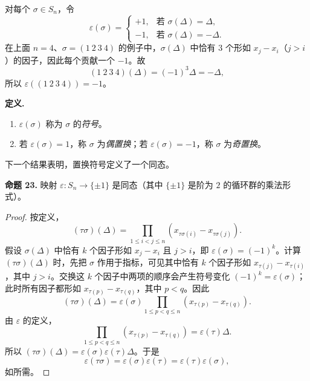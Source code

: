 对每个 $\sigma\in S_n$，令
\[
  \varepsilon(\sigma)=
  \begin{cases}
    +1,&\text{若 }\sigma(\Delta)=\Delta,\\
    -1,&\text{若 }\sigma(\Delta)=-\Delta.
  \end{cases}
\]
在上面 $n=4$、$\sigma=(1\ 2\ 3\ 4)$ 的例子中，$\sigma(\Delta)$ 中恰有 $3$ 个形如 $x_j-x_i$（$j>i$）的因子，因此每个贡献一个 $-1$。故
\[
  (1\ 2\ 3\ 4)(\Delta)=(-1)^3\Delta=-\Delta,
\]
所以 $\varepsilon((1\ 2\ 3\ 4))=-1$。

\noindent\textbf{定义.}
\begin{enumerate}[label=(\arabic*)]
  \item $\varepsilon(\sigma)$ 称为 $\sigma$ 的\emph{符号}。
  \item 若 $\varepsilon(\sigma)=1$，称 $\sigma$ 为\emph{偶置换}；若 $\varepsilon(\sigma)=-1$，称 $\sigma$ 为\emph{奇置换}。
\end{enumerate}

下一个结果表明，置换符号定义了一个同态。

\medskip
\noindent\textbf{命题 23.} 映射 $\varepsilon:S_n\to\{\pm1\}$ 是同态（其中 $\{\pm1\}$ 是阶为 $2$ 的循环群的乘法形式）。

\begin{proof}
按定义，
\[
  (\tau\sigma)(\Delta)=\prod_{1\leq i<j\leq n}(x_{\tau\sigma(i)}-x_{\tau\sigma(j)}).
\]
假设 $\sigma(\Delta)$ 中恰有 $k$ 个因子形如 $x_j-x_i$ 且 $j>i$，即 $\varepsilon(\sigma)=(-1)^k$。计算 $(\tau\sigma)(\Delta)$ 时，先把 $\sigma$ 作用于指标，可见其中恰有 $k$ 个因子形如 $x_{\tau(j)}-x_{\tau(i)}$，其中 $j>i$。交换这 $k$ 个因子中两项的顺序会产生符号变化 $(-1)^k=\varepsilon(\sigma)$；此时所有因子都形如 $x_{\tau(p)}-x_{\tau(q)}$，其中 $p<q$。因此
\[
  (\tau\sigma)(\Delta)=\varepsilon(\sigma)
  \prod_{1\leq p<q\leq n}(x_{\tau(p)}-x_{\tau(q)}).
\]
由 $\varepsilon$ 的定义，
\[
  \prod_{1\leq p<q\leq n}(x_{\tau(p)}-x_{\tau(q)})=\varepsilon(\tau)\Delta.
\]
所以 $(\tau\sigma)(\Delta)=\varepsilon(\sigma)\varepsilon(\tau)\Delta$。于是
\[
  \varepsilon(\tau\sigma)=\varepsilon(\sigma)\varepsilon(\tau)=\varepsilon(\tau)\varepsilon(\sigma),
\]
如所需。
\end{proof}

